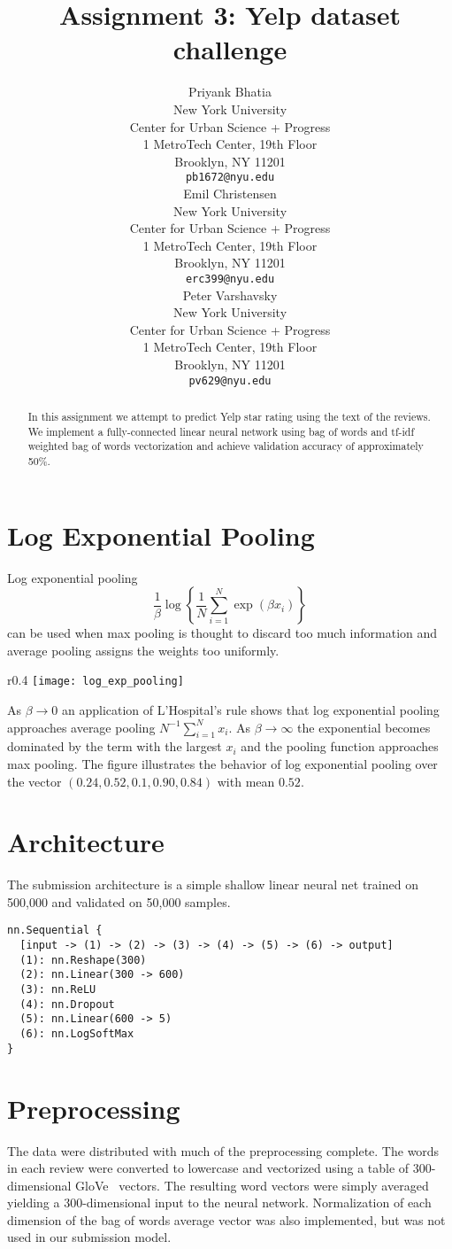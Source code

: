 \documentclass{article} %
\title{Assignment 3: Yelp dataset challenge}
\author{
Priyank Bhatia \\
New York University \\
Center for Urban Science + Progress \\
1 MetroTech Center, 19th Floor \\
Brooklyn, NY 11201 \\
\texttt{pb1672@nyu.edu} \\
\AND
Emil Christensen \\
New York University \\
Center for Urban Science + Progress \\
1 MetroTech Center, 19th Floor \\
Brooklyn, NY 11201 \\
\texttt{erc399@nyu.edu} \\
\And
Peter Varshavsky \\
New York University \\
Center for Urban Science + Progress \\
1 MetroTech Center, 19th Floor \\
Brooklyn, NY 11201 \\
\texttt{pv629@nyu.edu} \\
}
\begin{document}
\maketitle


\begin{abstract}
In this assignment we attempt to predict Yelp star rating using the text of the reviews. We implement a fully-connected linear neural network using bag of words and tf-idf weighted bag of words vectorization and achieve validation accuracy of approximately 50\%.\end{abstract}

\section{Log Exponential Pooling}
Log exponential pooling
\[
\frac{1}{\beta}\log\left\{
	\frac{1}{N}
	\sum_{i=1}^N
	\exp\left(\beta x_i \right)
	\right\}
\]
can be used when max pooling is thought to discard too much information and average pooling assigns the weights too uniformly.
\begin{wrapfigure}{r}{0.4\textwidth}
\texttt{[image: log\_exp\_pooling]}
\end{wrapfigure}
As $\beta \rightarrow 0$ an application of L'Hospital's rule shows that log exponential pooling approaches average pooling $N^{-1}\sum_{i=1}^N x_i$.
As $\beta \rightarrow \infty$ the exponential becomes dominated by the term with the largest $x_i$ and the pooling function approaches max pooling.
The figure illustrates the behavior of log exponential pooling over the vector $(0.24, 0.52, 0.1, 0.90, 0.84)$ with mean $0.52$.

\section{Architecture}
\label{arc}

The submission architecture is a simple shallow linear neural net trained on 500,000 and validated on 50,000 samples.
\begin{lstlisting}
nn.Sequential {
  [input -> (1) -> (2) -> (3) -> (4) -> (5) -> (6) -> output]
  (1): nn.Reshape(300)
  (2): nn.Linear(300 -> 600)
  (3): nn.ReLU
  (4): nn.Dropout
  (5): nn.Linear(600 -> 5)
  (6): nn.LogSoftMax
}
\end{lstlisting}

\section{Preprocessing}
\label{preproc}
The data were distributed with much of the preprocessing complete.
The words in each review were converted to lowercase and vectorized using a table of 300-dimensional GloVe~\cite{pennington14} vectors.
The resulting word vectors were simply averaged yielding a 300-dimensional input to the neural network. Normalization of each dimension of the bag of words average vector was also implemented, but was not used in our submission model.
\end{document}
